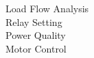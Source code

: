 \documentclass[preview]{standalone}
\begin{document}
Load Flow Analysis\\Relay Setting\\Power Quality\\Motor Control\\
\end{document}
